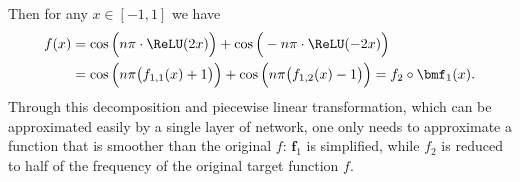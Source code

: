 \documentclass[review,hidelinks,onefignum,onetabnum]{siamart250211}
\begin{document}
Then for any $x\in [-1,1]$ we have 
\begin{equation*}
	\begin{split}
	    f(x)&=\cos\Big(n\pi  \cdot\ReLU(2x)\Big)+\cos\Big(-n\pi  \cdot\ReLU(-2x)\Big)
     \\& =\cos\Big(n\pi  \big(f_{1,1}(x)+1\big)\Big)+\cos\Big(n\pi  \big(f_{1,2}(x)-1\big)\Big)
 =
 f_2\circ \bmf_1(x).
	\end{split}
\end{equation*}
Through this decomposition and piecewise linear transformation, which can be approximated easily by a single layer of {\ReLU} network, one only needs to approximate a function that is smoother than the original $f$: $\bm{f}_1$ is simplified, while $f_2$ is reduced to half of the frequency of the original target function $f$. 
\end{document}
